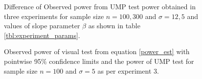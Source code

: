 \documentclass{article}
\begin{document}
\begin{figure}[hbtp]
   \centering
       \caption{Difference of Observed power from UMP test power obtained in three experiments for sample size $n= 100,300$ and $\sigma = 12,5$ and values of slope parameter $\beta$ as shown in table \ref{tbl:experiment_params}.}
       \label{fig:power_diff_exp}
\end{figure}


\begin{figure}[hbtp]
   \centering
       \caption{Observed power of visual test from equation \eqref{power_est} with pointwise 95\% confidence limits and the power of UMP test for sample size $n= 100$ and $\sigma = 5$ as per experiment 3.}
       \label{fig:power_observed_exp3}
\end{figure}
\end{document}
